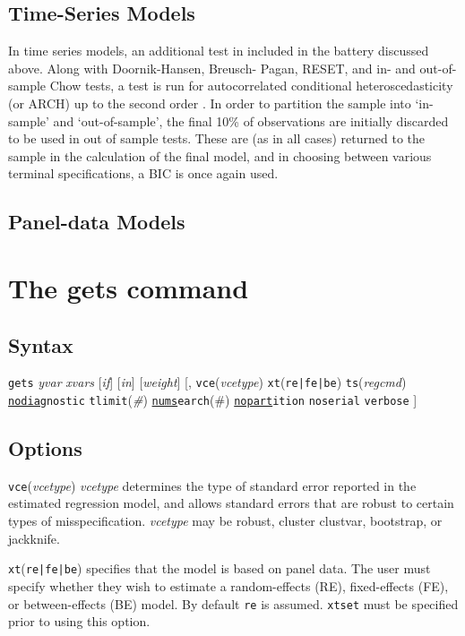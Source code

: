 \documentclass{article}[11pt]
\begin{document}
\begin{spacing}{1.2}
\subsection{Time-Series Models}
\label{sscn:Ats}
In time series models, an additional test in included in the battery discussed above.  Along with Doornik-Hansen, Breusch-%
Pagan, RESET, and in- and out-of-sample Chow tests, a test is run for autocorrelated conditional heteroscedasticity (or ARCH) 
up to the second order \citep{Engle1982}.  In order to partition the sample into `in-sample' and `out-of-sample', the 
final 10\% of observations are initially discarded to be used in out of sample tests.  These are (as in all cases) returned
to the sample in the calculation of the final model, and in choosing between various terminal specifications, a BIC is once
again used.


\subsection{Panel-data Models}
\label{sscn:Axt}
\citet{Drukker2003} \citet{Wooldridge2002} \citet{BreuschPagan1980}

\section{The gets command}
\subsection{Syntax}
\texttt{gets} \emph{yvar} \emph{xvars} [\emph{if}] [\emph{in}] [\emph{weight}] [, \texttt{vce}(\emph{vcetype}) \texttt{xt}(\texttt{re|fe|be}) \texttt{ts}(\emph{regcmd}) \texttt{\ul{nodiag}nostic} \texttt{tlimit}(\emph{\#})
\texttt{\ul{nums}earch}(\#) \texttt{\ul{nopart}ition} \texttt{noserial} \texttt{verbose} ]

\subsection{Options}
\texttt{vce}(\emph{vcetype}) \emph{vcetype} determines the type of standard error reported in the
estimated regression model, and allows standard errors that are robust to certain types of 
misspecification.  \emph{vcetype} may be robust, cluster clustvar, bootstrap, or jackknife.

\texttt{xt}(\texttt{re|fe|be}) specifies that the model is based on panel data.  The user must specify
whether they wish to estimate a random-effects (RE), fixed-effects (FE), or between-effects (BE) model.  
By default \texttt{re} is assumed.  \texttt{xtset} must be specified prior to using this option.


\end{spacing}
\end{document}
